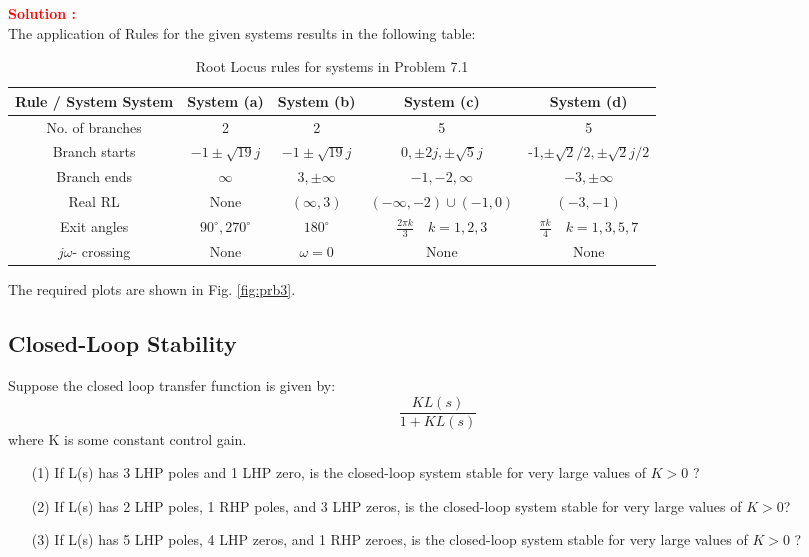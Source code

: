\documentclass[12pt]{article}
\begin{document}
\textbf{\textcolor{red}{Solution :}} \\
The application of Rules for the given systems results in the following table: \\
\begin{table}[H]
    \centering
    \begin{tabular}{|c|c|c|c|c|}
    \hline
       Rule / System System   &  System (a) & System (b) & System (c) & System (d) \\
       \hline
        No. of branches & 2 & 2& 5 & 5 \\
       \hline
        Branch starts & $-1 \pm \sqrt{19}j $ & $-1 \pm \sqrt{19}j $ & $ 0,\pm 2j, \pm \sqrt{5}j $ &  -1,$\pm\sqrt{2}/2, \pm\sqrt{2}j/2 $ \\
       \hline
        Branch ends & $\infty$ & $ 3, \pm \infty $ & $-1,-2, \infty $  & $-3, \pm \infty $ \\
       \hline
        Real RL & None & $\left(\infty, 3 \right)$ & $\left(-\infty,-2 \right) \cup \left(-1,0 \right)$ & $\left( -3, -1 \right) $  \\
       \hline
        Exit angles  & $90^\circ ,  270^\circ $ &  $ 180^\circ $ & $\frac{2 \pi k}{3} \quad k=1,2,3$ & $\frac{\pi k}{4 } \quad k=1,3,5,7$ \\
        \hline
        $j \omega$- crossing & None & $\omega=0$ & None & None \\
        \hline
    \end{tabular}
    \caption{Root Locus rules for systems in Problem 7.1}
    \label{tab:prb3}
\end{table}
The required plots are shown in Fig. \ref{fig:prb3}.
\clearpage

\subsection{Closed-Loop Stability} 

Suppose the closed loop transfer function is given by:
\[
\frac{K L(s)}{1+ K L(s)}
\]
where K is some constant control gain.
\begin{itemize}
    \item [(1)] If L(s) has 3 LHP poles and 1 LHP zero, is the closed-loop system stable for very large values of $K > 0$ ?
    \item [(2)] If L(s) has 2 LHP poles, 1 RHP poles, and 3 LHP zeros, is the closed-loop system stable for very large values of $K > 0$?
    \item [(3)] If L(s) has 5 LHP poles, 4 LHP zeros, and 1 RHP zeroes, is the closed-loop system stable for very large values of $K > 0$ ?
\end{itemize}
\end{document}
